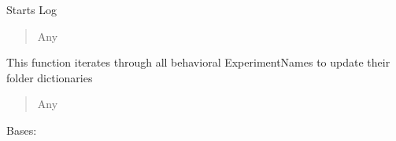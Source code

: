 \documentclass[letterpaper,10pt,english]{sphinxmanual}
\begin{document}
\begin{fulllineitems}

\begin{fulllineitems}
\label{\detokenize{Organization:Organization.Mouse.start_log}}
\pysigstartsignatures
{}
\pysigstopsignatures
\sphinxAtStartPar
Starts Log
\begin{quote}\begin{description}
\sphinxAtStartPar
Any

\end{description}\end{quote}

\end{fulllineitems}


\begin{fulllineitems}
\label{\detokenize{Organization:Organization.Mouse.update_all_folder_dictionaries}}
\pysigstartsignatures
{}
\pysigstopsignatures
\sphinxAtStartPar
This function iterates through all behavioral ExperimentNames to update their folder dictionaries
\begin{quote}\begin{description}
\sphinxAtStartPar
Any

\end{description}\end{quote}

\end{fulllineitems}


\end{fulllineitems}


\begin{fulllineitems}
\label{\detokenize{Organization:Organization.Study}}
\pysigstartsignatures
{}
\pysigstopsignatures
\sphinxAtStartPar
Bases: 

\end{fulllineitems}
\end{document}
